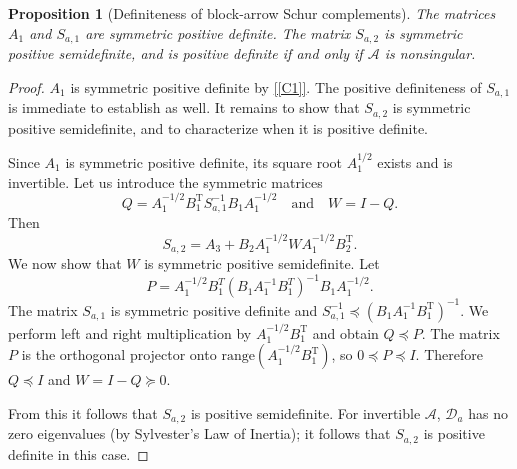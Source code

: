 \documentclass{article}
\newtheorem{proposition}{Proposition}
\newcommand{\spsd}{\succeq 0}
\newcommand{\range}{\mathrm{range}}
\newcommand{\T}{\mathrm{T}}
\newcommand{\sA}{\mathcal{A}}
\begin{document}
\begin{proposition}[Definiteness of block-arrow Schur complements] The matrices $A_1$ and  $S_{a,1}$ are symmetric positive definite. The matrix $S_{a,2}$ is symmetric positive semidefinite, and is positive definite if and only if $\sA$ is nonsingular.
\label{prop:spd}
\end{proposition}
\begin{proof}
    $A_1$ is symmetric positive definite by  \ref{[C1]}. The positive definiteness of $S_{a,1}$ is immediate to establish as well. It remains  to show that $S_{a,2}$ is symmetric positive semidefinite, and to characterize when it is positive definite.

Since $A_1$ is  symmetric positive definite, its square root $A_1^{1/2}$ exists and is invertible. Let us introduce the symmetric matrices
\begin{equation}
Q = A_1^{-1/2} B_1^\T S_{a,1}^{-1} B_1 A_1^{-1/2} \quad\text{and}\quad W = I - Q.
\end{equation}
Then
\begin{equation*}
S_{a,2} = A_3 + B_2 A_1^{-1/2} W A_1^{-1/2} B_2^\T.
\end{equation*}
We now  show that $W$  is symmetric positive semidefinite.  
Let $$P=A_1^{-1/2} B_1^T (B_1 A_1^{-1} B_1^T)^{-1} B_1 A_1^{-1/2}. $$
The matrix $S_{a,1}$ is symmetric positive definite and $S_{a,1}^{-1} \preceq (B_1 A_1^{-1} B_1^\T)^{-1}$.
We perform left and right multiplication by $A_1^{-1/2} B_1^\T$ and obtain $Q \preceq P$. The matrix $P$ is the orthogonal projector onto $\range(A_1^{-1/2} B_1^\T)$, so $0\preceq P\preceq I$. Therefore $Q\preceq I$ and $W=I-Q\spsd$.

From this it follows that $S_{a,2}$ is positive semidefinite. For invertible $\sA$, $\mathcal{D}_a$ has no zero eigenvalues (by Sylvester's Law of Inertia); it follows that $S_{a,2}$ is positive definite in this case.
\end{proof}
\end{document}

